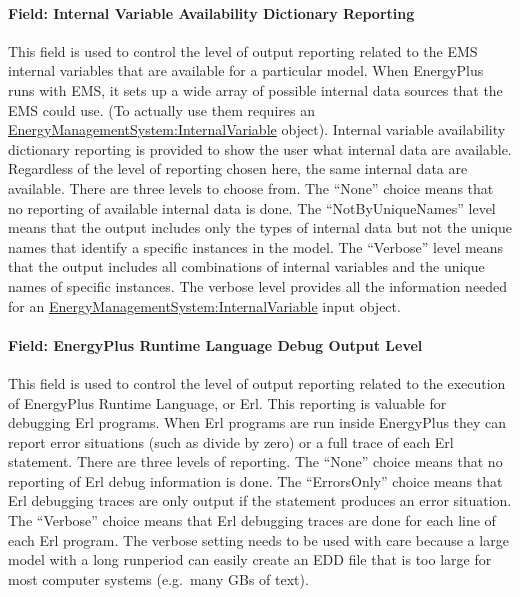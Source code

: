 \paragraph{Field: Internal Variable Availability Dictionary Reporting}\label{field-internal-variable-availability-dictionary-reporting}

This field is used to control the level of output reporting related to the EMS internal variables that are available for a particular model. When EnergyPlus runs with EMS, it sets up a wide array of possible internal data sources that the EMS could use. (To actually use them requires an \hyperref[energymanagementsysteminternalvariable]{EnergyManagementSystem:InternalVariable} object). Internal variable availability dictionary reporting is provided to show the user what internal data are available. Regardless of the level of reporting chosen here, the same internal data are available. There are three levels to choose from. The ``None'' choice means that no reporting of available internal data is done. The ``NotByUniqueNames'' level means that the output includes only the types of internal data but not the unique names that identify a specific instances in the model. The ``Verbose'' level means that the output includes all combinations of internal variables and the unique names of specific instances. The verbose level provides all the information needed for an \hyperref[energymanagementsysteminternalvariable]{EnergyManagementSystem:InternalVariable} input object.

\paragraph{Field: EnergyPlus Runtime Language Debug Output Level}\label{field-energyplus-runtime-language-debug-output-level}

This field is used to control the level of output reporting related to the execution of EnergyPlus Runtime Language, or Erl. This reporting is valuable for debugging Erl programs. When Erl programs are run inside EnergyPlus they can report error situations (such as divide by zero) or a full trace of each Erl statement. There are three levels of reporting. The ``None'' choice means that no reporting of Erl debug information is done. The ``ErrorsOnly'' choice means that Erl debugging traces are only output if the statement produces an error situation. The ``Verbose'' choice means that Erl debugging traces are done for each line of each Erl program. The verbose setting needs to be used with care because a large model with a long runperiod can easily create an EDD file that is too large for most computer systems (e.g.~many GBs of text).

